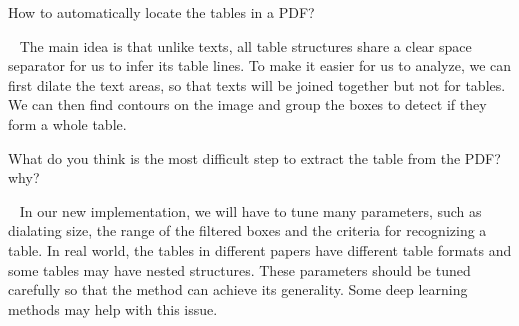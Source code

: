 \begin{exercise}[]{How to automatically locate the tables in a PDF?}
  \begin{solution}
  \par{~}
  The main idea is that unlike texts, all table structures share a clear space separator for us to infer its table lines. To make it easier for us to analyze, we can first dilate the text areas, so that texts will be joined together but not for tables. We can then find contours on the image and group the boxes to detect if they form a whole table.
  \end{solution}
  \label{ex1}
\end{exercise}

\begin{exercise}[]{What do you think is the most difficult step to extract the table from the PDF? why?}
  \begin{solution}
  \par{~}
  In our new implementation, we will have to tune many parameters, such as dialating size, the range of the filtered boxes and the criteria for recognizing a table. In real world, the tables in different papers have different table formats and some tables may have nested structures. These parameters should be tuned carefully so that the method can achieve its generality. Some deep learning methods may help with this issue.
  \end{solution}
  \label{ex2}
\end{exercise}
